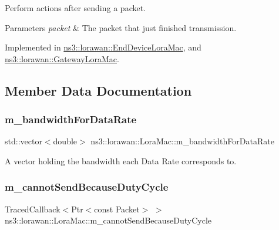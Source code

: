 Perform actions after sending a packet.


\begin{DoxyParams}{Parameters}
{\em packet} & The packet that just finished transmission. \\
\hline
\end{DoxyParams}


Implemented in \hyperlink{classns3_1_1lorawan_1_1EndDeviceLoraMac_a939732c613ae14a71c902ade45ee2e40}{ns3\+::lorawan\+::\+End\+Device\+Lora\+Mac}, and \hyperlink{classns3_1_1lorawan_1_1GatewayLoraMac_a115cbb38716b278b7bac756386a5ae77}{ns3\+::lorawan\+::\+Gateway\+Lora\+Mac}.



\subsection{Member Data Documentation}
\mbox{\label{classns3_1_1lorawan_1_1LoraMac_a552da80de353193c4021988b402904ec}} 
\subsubsection{\texorpdfstring{m\+\_\+bandwidth\+For\+Data\+Rate}{m\_bandwidthForDataRate}}
{\footnotesize\ttfamily std\+::vector$<$double$>$ ns3\+::lorawan\+::\+Lora\+Mac\+::m\+\_\+bandwidth\+For\+Data\+Rate\hspace{0.3cm}{\ttfamily [protected]}}

A vector holding the bandwidth each Data Rate corresponds to. \mbox{\label{classns3_1_1lorawan_1_1LoraMac_a18ac5a42fe1cf9284f13b024811ea251}} 
\subsubsection{\texorpdfstring{m\+\_\+cannot\+Send\+Because\+Duty\+Cycle}{m\_cannotSendBecauseDutyCycle}}
{\footnotesize\ttfamily Traced\+Callback$<$Ptr$<$const Packet$>$ $>$ ns3\+::lorawan\+::\+Lora\+Mac\+::m\+\_\+cannot\+Send\+Because\+Duty\+Cycle\hspace{0.3cm}{\ttfamily [protected]}}

